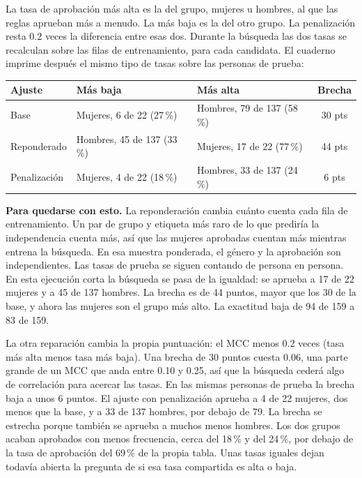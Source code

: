 \documentclass[11pt]{article}
\newcommand{\pct}[1]{\mbox{#1\,\%}}
\begin{document}
La tasa de aprobación más alta es la del grupo, mujeres u hombres, al que las reglas aprueban más a menudo. La más baja es la del otro grupo. La penalización resta \(0.2\) veces la diferencia entre esas dos. Durante la búsqueda las dos tasas se recalculan sobre las filas de entrenamiento, para cada candidata. El cuaderno imprime después el mismo tipo de tasas sobre las personas de prueba:

\begin{table}[H]
\centering
\small
\begin{tabularx}{\textwidth}{@{}l Y Y c@{}}
\toprule
Ajuste & Más baja & Más alta & Brecha \\
\midrule
Base & Mujeres, 6 de 22 (\pct{27}) & Hombres, 79 de 137 (\pct{58}) & 30 pts \\
Reponderado & Hombres, 45 de 137 (\pct{33}) & Mujeres, 17 de 22 (\pct{77}) & 44 pts \\
Penalización & Mujeres, 4 de 22 (\pct{18}) & Hombres, 33 de 137 (\pct{24}) & 6 pts \\
\bottomrule
\end{tabularx}
\end{table}

\begin{plainwords}
\textbf{Para quedarse con esto.} La reponderación cambia cuánto cuenta cada fila de entrenamiento. Un par de grupo y etiqueta más raro de lo que prediría la independencia cuenta más, así que las mujeres aprobadas cuentan más mientras entrena la búsqueda. En esa muestra ponderada, el género y la aprobación son independientes. Las tasas de prueba se siguen contando de persona en persona. En esta ejecución corta la búsqueda se pasa de la igualdad: se aprueba a 17 de 22 mujeres y a 45 de 137 hombres. La brecha es de 44 puntos, mayor que los 30 de la base, y ahora las mujeres son el grupo más alto. La exactitud baja de 94 de 159 a 83 de 159.

La otra reparación cambia la propia puntuación: el MCC menos \(0.2\) veces (tasa más alta menos tasa más baja). Una brecha de 30 puntos cuesta \(0.06\), una parte grande de un MCC que anda entre 0.10 y 0.25, así que la búsqueda cederá algo de correlación para acercar las tasas. En las mismas personas de prueba la brecha baja a unos 6 puntos. El ajuste con penalización aprueba a 4 de 22 mujeres, dos menos que la base, y a 33 de 137 hombres, por debajo de 79. La brecha se estrecha porque también se aprueba a muchos menos hombres. Los dos grupos acaban aprobados con menos frecuencia, cerca del \pct{18} y del \pct{24}, por debajo de la tasa de aprobación del \pct{69} de la propia tabla. Unas tasas iguales dejan todavía abierta la pregunta de si esa tasa compartida es alta o baja.
\end{plainwords}
\end{document}
